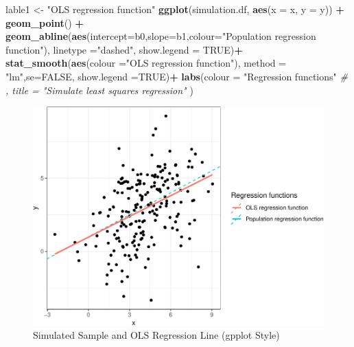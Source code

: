 \documentclass[]{book}
\newenvironment{Shaded}{\begin{snugshade}}{\end{snugshade}}
\newcommand{\CommentTok}[1]{\textcolor[rgb]{0.56,0.35,0.01}{\textit{#1}}}
\newcommand{\DataTypeTok}[1]{\textcolor[rgb]{0.13,0.29,0.53}{#1}}
\newcommand{\KeywordTok}[1]{\textcolor[rgb]{0.13,0.29,0.53}{\textbf{#1}}}
\newcommand{\NormalTok}[1]{#1}
\newcommand{\OperatorTok}[1]{\textcolor[rgb]{0.81,0.36,0.00}{\textbf{#1}}}
\newcommand{\OtherTok}[1]{\textcolor[rgb]{0.56,0.35,0.01}{#1}}
\newcommand{\StringTok}[1]{\textcolor[rgb]{0.31,0.60,0.02}{#1}}
\begin{document}
\begin{Shaded}
\begin{Highlighting}[]
\NormalTok{lable1 <-}\StringTok{ "OLS regression function"}
\KeywordTok{ggplot}\NormalTok{(simulation.df, }\KeywordTok{aes}\NormalTok{(}\DataTypeTok{x =}\NormalTok{ x,  }\DataTypeTok{y =}\NormalTok{ y)) }\OperatorTok{+}
\StringTok{  }\KeywordTok{geom_point}\NormalTok{() }\OperatorTok{+}
\StringTok{  }\KeywordTok{geom_abline}\NormalTok{(}\KeywordTok{aes}\NormalTok{(}\DataTypeTok{intercept=}\NormalTok{b0,}\DataTypeTok{slope=}\NormalTok{b1,}\DataTypeTok{colour=}\StringTok{"Population regression function"}\NormalTok{), }\DataTypeTok{linetype =}\StringTok{"dashed"}\NormalTok{, }\DataTypeTok{show.legend  =} \OtherTok{TRUE}\NormalTok{)}\OperatorTok{+}
\StringTok{  }\KeywordTok{stat_smooth}\NormalTok{(}\KeywordTok{aes}\NormalTok{(}\DataTypeTok{colour =}\StringTok{"OLS regression function"}\NormalTok{), }\DataTypeTok{method =} \StringTok{"lm"}\NormalTok{,}\DataTypeTok{se=}\OtherTok{FALSE}\NormalTok{, }\DataTypeTok{show.legend =}\OtherTok{TRUE}\NormalTok{)}\OperatorTok{+}
\StringTok{  }\KeywordTok{labs}\NormalTok{(}\DataTypeTok{colour =} \StringTok{"Regression functions"} 
       \CommentTok{# , title = "Simulate least squares regression"}
\NormalTok{  )}
\end{Highlighting}
\end{Shaded}

\begin{figure}

{\centering \includegraphics[width=0.8\linewidth]{MEM5220_R_files/figure-latex/fig6-1} 

}

\caption{Simulated Sample and OLS Regression Line (gpplot Style)}\label{fig:fig6}
\end{figure}
\end{document}
